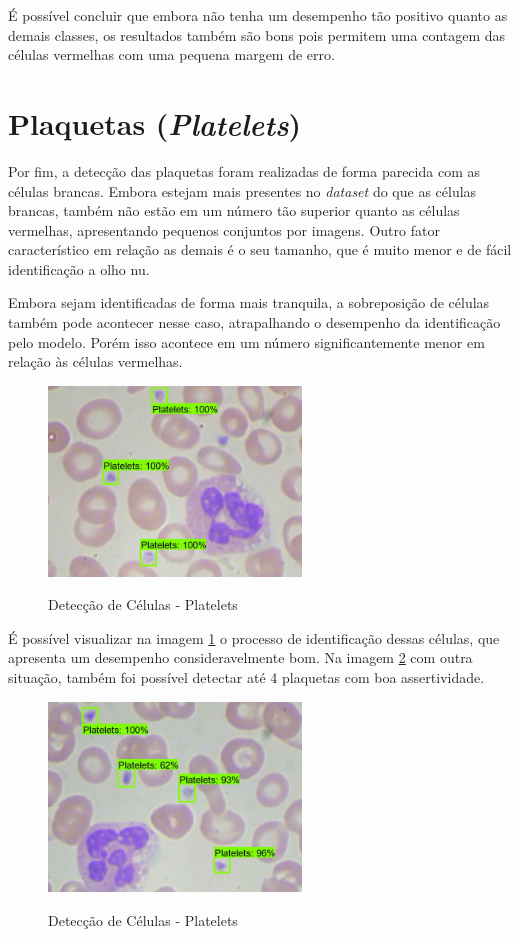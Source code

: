 É possível concluir que embora não tenha um desempenho tão positivo quanto as demais classes, os resultados também são bons pois permitem uma contagem das células vermelhas com uma pequena margem de erro.

\section{Plaquetas (\emph{Platelets})}
Por fim, a detecção das plaquetas foram realizadas de forma parecida com as células brancas. Embora estejam mais presentes no \emph{dataset} do que as células brancas, também não estão em um número tão superior quanto as células vermelhas, apresentando pequenos conjuntos por imagens. Outro fator característico em relação as demais é o seu tamanho, que é muito menor e de fácil identificação a olho nu.

Embora sejam identificadas de forma mais tranquila, a sobreposição de células também pode acontecer nesse caso, atrapalhando o desempenho da identificação pelo modelo. Porém isso acontece em um número significantemente menor em relação às células vermelhas.

\begin{figure}[!htb]
	\centering
	\caption{Detecção de Células - Platelets}
	\includegraphics[width=0.60\textwidth]{img/predict_platelets.jpeg}
	\label{fig:predict_platelets}
\end{figure}

É possível visualizar na imagem \ref{fig:predict_platelets} o processo de identificação dessas células, que apresenta um desempenho consideravelmente bom. Na imagem \ref{fig:predict_platelets_2} com outra situação, também foi possível detectar até 4 plaquetas com boa assertividade.

\begin{figure}[!htb]
	\centering
	\caption{Detecção de Células - Platelets}
	\includegraphics[width=0.60\textwidth]{img/predict_platelets_2.jpeg}
	\label{fig:predict_platelets_2}
\end{figure}

